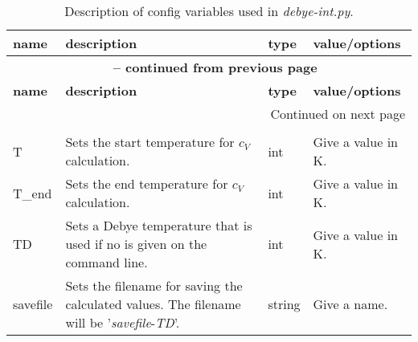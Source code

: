 %
\begin{landscape}
\begin{longtable}{p{4cm}p{5cm}p{2cm}p{8cm}}
	\caption{Description of config variables used in \emph{debye-int.py}.}\label{tbl:cfg-vars_debye-int}\\
	\textbf{name}	&\textbf{description}	&\textbf{type}	&\textbf{value/options}\\
	\toprule
	\endfirsthead

	\multicolumn{4}{c}{{\bfseries \tablename\ \thetable{} -- continued from previous page}} \\
	\toprule
	\textbf{name}	&\textbf{description}	&\textbf{type}	&\textbf{value/options}\\
	\toprule
	\endhead

	\hline \multicolumn{4}{|r|}{{Continued on next page}} \\ \hline
	\endfoot

	\toprule
	\endlastfoot
	
	\multicolumn{4}{c}{\textbf{$\bm{c_p}$ Algorithm}}\\
	\midrule
	T	&Sets the start temperature for $c_V$ calculation.	&int	&Give a value in K.\\
	\midrule
	T\_end	&Sets the end temperature for $c_V$ calculation.	&int	&Give a value in K.\\
	\midrule
	TD	&Sets a Debye temperature that is used if no is given on the command line.	&int	&Give a value in K.\\
	\midrule
	savefile	&Sets the filename for saving the calculated values. The filename will be '\emph{savefile}-\emph{TD}'.	&string	&Give a name.\\
	\bottomrule
\end{longtable}
\end{landscape}
